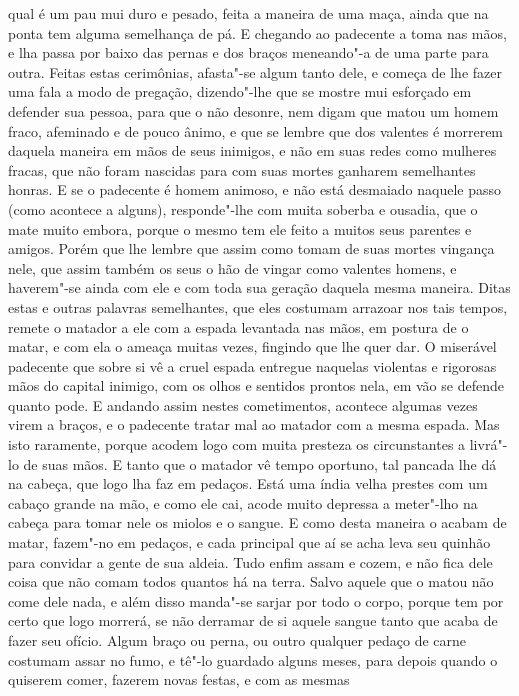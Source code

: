 qual é um pau mui duro e pesado, feita a maneira de uma maça, ainda que
na ponta tem alguma semelhança de pá. E chegando ao padecente a toma nas
mãos, e lha passa por baixo das pernas e dos braços meneando"-a de uma
parte para outra. Feitas estas cerimônias, afasta"-se algum tanto dele, e
começa de lhe fazer uma fala a modo de pregação, dizendo"-lhe que se
mostre mui esforçado em defender sua pessoa, para que o não desonre,
nem digam que matou um homem fraco, afeminado e de pouco ânimo, e que
se lembre que dos valentes é morrerem daquela maneira em mãos de seus
inimigos, e não em suas redes como mulheres fracas, que não foram
nascidas para com suas mortes ganharem semelhantes honras. E se o
padecente é homem animoso, e não está desmaiado naquele passo (como
acontece a alguns), responde"-lhe com muita soberba e ousadia, que o mate
muito embora, porque o mesmo tem ele feito a muitos seus parentes e
amigos. Porém que lhe lembre que assim como tomam de suas mortes
vingança nele, que assim também os seus o hão de vingar como valentes
homens, e haverem"-se ainda com ele e com toda sua geração daquela mesma
maneira. Ditas estas e outras palavras semelhantes, que eles costumam
arrazoar nos tais tempos, remete o matador a ele com a espada levantada
nas mãos, em postura de o matar, e com ela o ameaça muitas vezes,
fingindo que lhe quer dar. O miserável padecente que sobre si vê a
cruel espada entregue naquelas violentas e rigorosas mãos do capital
inimigo, com os olhos e sentidos prontos nela, em vão se defende quanto
pode. E andando assim nestes cometimentos, acontece algumas vezes virem a
braços, e o padecente tratar mal ao matador com a mesma espada. Mas
isto raramente, porque acodem logo com muita presteza os circunstantes
a livrá"-lo de suas mãos. E tanto que o matador vê tempo oportuno, tal
pancada lhe dá na cabeça, que logo lha faz em pedaços. Está uma índia
velha prestes com um cabaço grande na mão, e como ele cai, acode muito
depressa a meter"-lho na cabeça para tomar nele os miolos e o sangue. E
como desta maneira o acabam de matar, fazem"-no em pedaços, e cada
principal que aí se acha leva seu quinhão para convidar a gente de sua
aldeia. Tudo enfim assam e cozem, e não fica dele coisa que não comam
todos quantos há na terra. Salvo aquele que o matou não come dele nada,
e além disso manda"-se sarjar por todo o corpo, porque tem por certo que
logo morrerá, se não derramar de si aquele sangue tanto que acaba de
fazer seu ofício. Algum braço ou perna, ou outro qualquer pedaço de
carne costumam assar no fumo, e tê"-lo guardado alguns meses, para
depois quando o quiserem comer, fazerem novas festas, e com as mesmas
